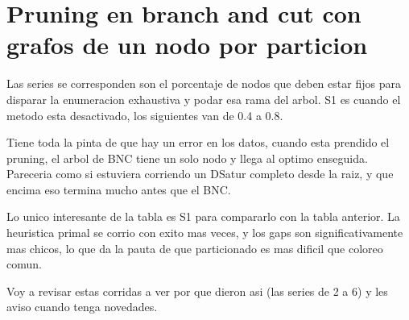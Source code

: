 \documentclass[landscape, 12pt]{report}
\begin{document}
	\clearpage
	

\section*{Pruning en branch and cut con grafos de un nodo por particion}
	
Las series se corresponden son el porcentaje de nodos que deben estar fijos para disparar la enumeracion exhaustiva y podar esa rama del arbol. S1 es cuando el metodo esta desactivado, los siguientes van de 0.4 a 0.8.

Tiene toda la pinta de que hay un error en los datos, cuando esta prendido el pruning, el arbol de BNC tiene un solo nodo y llega al optimo enseguida. Pareceria como si estuviera corriendo un DSatur completo desde la raiz, y que encima eso termina mucho antes que el BNC.

Lo unico interesante de la tabla es S1 para compararlo con la tabla anterior. La heuristica primal se corrio con exito mas veces, y los gaps son significativamente mas chicos, lo que da la pauta de que particionado es mas dificil que coloreo comun.
	
Voy a revisar estas corridas a ver por que dieron asi (las series de 2 a 6) y les aviso cuando tenga novedades.
	
\end{document}
